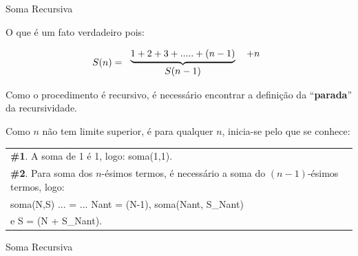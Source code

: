 \documentclass[sans]{beamer}
\begin{document}
\begin{frame}[fragile]
\begin{block}{Soma Recursiva}

O que \'{e} um fato verdadeiro pois:

\[
S(n)=
\begin{tabular}[c]{cc}
$\underbrace{1+2+3+.....+(n-1)}$ &  $  + n$\\
$S(n-1)$ &
\end{tabular}
\]

Como o procedimento é recursivo, é necessário encontrar a definição da ``\textbf{parada}'' da recursividade. 

Como $n$ não tem limite superior, é para qualquer $n$, inicia-se pelo que se conhece:
{\small
\begin{center}
\begin{tabular}[l]{p{}}\hline\hline
\textbf{\#1}. A soma de 1 \'{e} 1, logo: soma(1,1).\\
\textbf{\#2}. Para soma dos $n$-\'{e}simos termos, \'{e} necess\'{a}rio
 a soma do $(n-1)$-\'{e}simos termos, logo:\\
soma(N,S) ... = ... Nant = (N-1), soma(Nant, S\_Nant)\\
 e S = (N + S\_Nant).\\\hline\hline
\end{tabular}
\end{center}
}


\end{block}
\end{frame}


\begin{frame}[fragile]
\begin{block}{Soma  Recursiva}

{\small
\inputminted{Prolog}{prolog/soma2.pl}
}

\end{block}

\end{frame}
\end{document}
